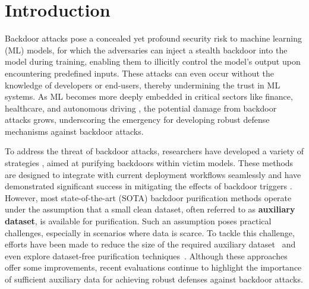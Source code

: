 \section{Introduction}
Backdoor attacks pose a concealed yet profound security risk to machine learning (ML) models, for which the adversaries can inject a stealth backdoor into the model during training, enabling them to illicitly control the model's output upon encountering predefined inputs. These attacks can even occur without the knowledge of developers or end-users, thereby undermining the trust in ML systems. As ML becomes more deeply embedded in critical sectors like finance, healthcare, and autonomous driving \citep{he2016deep, liu2020computing, tournier2019mrtrix3, adjabi2020past}, the potential damage from backdoor attacks grows, underscoring the emergency for developing robust defense mechanisms against backdoor attacks.

To address the threat of backdoor attacks, researchers have developed a variety of strategies \cite{liu2018fine,wu2021adversarial,wang2019neural,zeng2022adversarial,zhu2023neural,Zhu_2023_ICCV, wei2024shared,wei2024d3}, aimed at purifying backdoors within victim models. These methods are designed to integrate with current deployment workflows seamlessly and have demonstrated significant success in mitigating the effects of backdoor triggers \cite{wubackdoorbench, wu2023defenses, wu2024backdoorbench,dunnett2024countering}.  However, most state-of-the-art (SOTA) backdoor purification methods operate under the assumption that a small clean dataset, often referred to as \textbf{auxiliary dataset}, is available for purification. Such an assumption poses practical challenges, especially in scenarios where data is scarce. To tackle this challenge, efforts have been made to reduce the size of the required auxiliary dataset~\cite{chai2022oneshot,li2023reconstructive, Zhu_2023_ICCV} and even explore dataset-free purification techniques~\cite{zheng2022data,hong2023revisiting,lin2024fusing}. Although these approaches offer some improvements, recent evaluations \cite{dunnett2024countering, wu2024backdoorbench} continue to highlight the importance of sufficient auxiliary data for achieving robust defenses against backdoor attacks.


